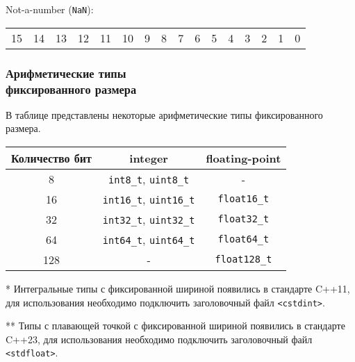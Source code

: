 \documentclass[compress, 8pt]{beamer}
\newenvironment{sixteenbit}{%
    \begin{center}
        \begin{tabular}{ |m{0.2cm}|m{0.2cm}|m{0.2cm}|m{0.2cm}|m{0.2cm}|m{0.2cm}|m{0.2cm}|m{0.2cm}|m{0.2cm}|m{0.2cm}|m{0.2cm}|m{0.2cm}|m{0.2cm}|m{0.2cm}|m{0.2cm}|m{0.2cm}|  }
            \hline
}{
        \hline
        \multicolumn{1}{c}{\color{gray}\tiny{15}} &
        \multicolumn{1}{c}{\color{gray}\tiny{14}} &
        \multicolumn{1}{c}{\color{gray}\tiny{13}} &
        \multicolumn{1}{c}{\color{gray}\tiny{12}} &
        \multicolumn{1}{c}{\color{gray}\tiny{11}} &
        \multicolumn{1}{c}{\color{gray}\tiny{10}} &
        \multicolumn{1}{c}{\color{gray}\tiny{9}} &
        \multicolumn{1}{c}{\color{gray}\tiny{8}} &
        \multicolumn{1}{c}{\color{gray}\tiny{7}} &
        \multicolumn{1}{c}{\color{gray}\tiny{6}} &
        \multicolumn{1}{c}{\color{gray}\tiny{5}} &
        \multicolumn{1}{c}{\color{gray}\tiny{4}} &
        \multicolumn{1}{c}{\color{gray}\tiny{3}} &
        \multicolumn{1}{c}{\color{gray}\tiny{2}} &
        \multicolumn{1}{c}{\color{gray}\tiny{1}} &
        \multicolumn{1}{c}{\color{gray}\tiny{0}} \\
        \end{tabular}
    \end{center}
}
\begin{document}
\begin{frame}[fragile]
    Not-a-number (\verb|NaN|):

    \begin{sixteenbit}
        \cellcolor{blue!40!white}{0} &
        \cellcolor{green!40!white}{1} &
        \cellcolor{green!40!white}{1} &
        \cellcolor{green!40!white}{1} &
        \cellcolor{green!40!white}{1} &
        \cellcolor{green!40!white}{1} &
        \cellcolor{red!40!white}{0} &
        \cellcolor{red!40!white}{0} &
        \cellcolor{red!40!white}{0} &
        \cellcolor{red!40!white}{0} &
        \cellcolor{red!40!white}{0} &
        \cellcolor{red!40!white}{0} &
        \cellcolor{red!40!white}{0} &
        \cellcolor{red!40!white}{0} &
        \cellcolor{red!40!white}{0} &
        \cellcolor{red!40!white}{1} \\
    \end{sixteenbit}

\end{frame}

\begin{frame}[fragile]

    \frametitle{Арифметические типы \\ фиксированного размера}

    В таблице представлены некоторые арифметические типы
    фиксированного размера.

    \begin{table}[H]
        \begin{threeparttable}
            \begin{tabular}{|c|c|c|}
                \hline
                Количество бит & integer & floating-point \\
                \hline
                \hline
                8 & \verb|int8_t|\tnote{*}, \verb|uint8_t| & - \\
                16 & \verb|int16_t|, \verb|uint16_t| & \verb|float16_t|\tnote{**} \\
                32 & \verb|int32_t|, \verb|uint32_t| & \verb|float32_t| \\
                64 & \verb|int64_t|, \verb|uint64_t| & \verb|float64_t| \\
                128 & - & \verb|float128_t| \\
                \hline
            \end{tabular}
            \begin{tablenotes}
            \small
            \item[*] Интегральные типы с фиксированной шириной появились
                в стандарте C++11, для использования необходимо подключить
                заголовочный файл \verb|<cstdint>|.
            \item[**] Типы с плавающей точкой с фиксированной шириной появились
                в стандарте C++23, для использования необходимо подключить
                заголовочный файл \verb|<stdfloat>|.
            \end{tablenotes}
        \end{threeparttable}
    \end{table}

\end{frame}
\end{document}
